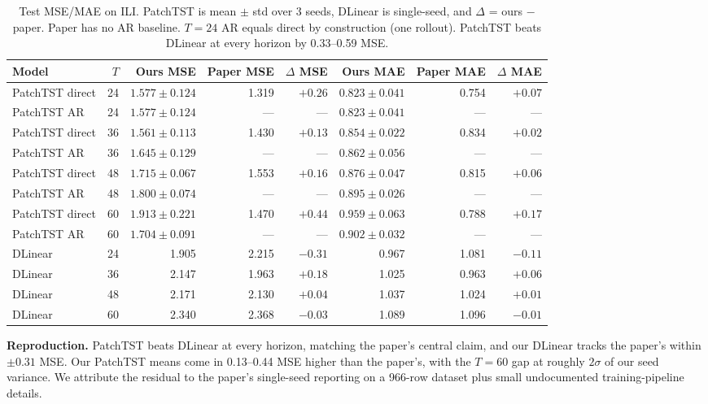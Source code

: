 \documentclass[11pt]{article}
\begin{document}
\begin{table}[h]
\centering\small
\begin{tabular}{lrrrrrrr}
\toprule
Model & $T$ & Ours MSE & Paper MSE & $\Delta$ MSE & Ours MAE & Paper MAE & $\Delta$ MAE \\
\midrule
PatchTST direct & 24 & $1.577 \pm 0.124$ & 1.319 & $+0.26$ & $0.823 \pm 0.041$ & 0.754 & $+0.07$ \\
PatchTST AR     & 24 & $1.577 \pm 0.124$ & ---   & ---    & $0.823 \pm 0.041$ & ---   & ---    \\
PatchTST direct & 36 & $1.561 \pm 0.113$ & 1.430 & $+0.13$ & $0.854 \pm 0.022$ & 0.834 & $+0.02$ \\
PatchTST AR     & 36 & $1.645 \pm 0.129$ & ---   & ---    & $0.862 \pm 0.056$ & ---   & ---    \\
PatchTST direct & 48 & $1.715 \pm 0.067$ & 1.553 & $+0.16$ & $0.876 \pm 0.047$ & 0.815 & $+0.06$ \\
PatchTST AR     & 48 & $1.800 \pm 0.074$ & ---   & ---    & $0.895 \pm 0.026$ & ---   & ---    \\
PatchTST direct & 60 & $1.913 \pm 0.221$ & 1.470 & $+0.44$ & $0.959 \pm 0.063$ & 0.788 & $+0.17$ \\
PatchTST AR     & 60 & $1.704 \pm 0.091$ & ---   & ---    & $0.902 \pm 0.032$ & ---   & ---    \\
\midrule
DLinear & 24 & 1.905 & 2.215 & $-0.31$ & 0.967 & 1.081 & $-0.11$ \\
DLinear & 36 & 2.147 & 1.963 & $+0.18$ & 1.025 & 0.963 & $+0.06$ \\
DLinear & 48 & 2.171 & 2.130 & $+0.04$ & 1.037 & 1.024 & $+0.01$ \\
DLinear & 60 & 2.340 & 2.368 & $-0.03$ & 1.089 & 1.096 & $-0.01$ \\
\bottomrule
\end{tabular}
\caption{\small Test MSE/MAE on ILI. PatchTST is mean $\pm$ std over 3 seeds, DLinear is single-seed, and $\Delta$ = ours $-$ paper. Paper has no AR baseline. $T{=}24$ AR equals direct by construction (one rollout). PatchTST beats DLinear at every horizon by 0.33--0.59 MSE.}
\end{table}

\vspace{-0.5em}
\textbf{Reproduction.} PatchTST beats DLinear at every horizon, matching the paper's central claim, and our DLinear tracks the paper's within $\pm 0.31$ MSE. Our PatchTST means come in 0.13--0.44 MSE higher than the paper's, with the $T{=}60$ gap at roughly $2\sigma$ of our seed variance. We attribute the residual to the paper's single-seed reporting on a 966-row dataset plus small undocumented training-pipeline details.
\end{document}
